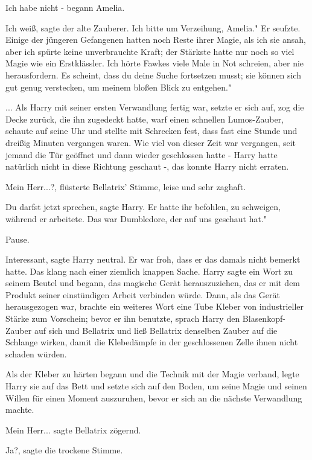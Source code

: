 \glqq Ich habe nicht -\grqq{} begann Amelia.

\glqq Ich weiß\grqq{}, sagte der alte Zauberer. \glqq Ich bitte um Verzeihung,
Amelia." Er seufzte. \glqq Einige der jüngeren Gefangenen hatten noch Reste
ihrer Magie, als ich sie ansah, aber ich spürte keine unverbrauchte Kraft; der
Stärkste hatte nur noch so viel Magie wie ein Erstklässler. Ich hörte Fawkes
viele Male in Not schreien, aber nie herausfordern. Es scheint, dass du deine
Suche fortsetzen musst; sie können sich gut genug verstecken, um meinem bloßen
Blick zu entgehen."

... Als Harry mit seiner ersten Verwandlung fertig war, setzte er sich auf, zog
die Decke zurück, die ihn zugedeckt hatte, warf einen schnellen Lumos-Zauber,
schaute auf seine Uhr und stellte mit Schrecken fest, dass fast eine Stunde und
dreißig Minuten vergangen waren. Wie viel von dieser Zeit war vergangen, seit
jemand die Tür geöffnet und dann wieder geschlossen hatte - Harry hatte
natürlich nicht in diese Richtung geschaut -, das konnte Harry nicht erraten.

\glqq Mein Herr...?\grqq{}, flüsterte Bellatrix' Stimme, leise und sehr zaghaft.

\glqq Du darfst jetzt sprechen\grqq{}, sagte Harry. Er hatte ihr befohlen, zu
schweigen, während er arbeitete. \glqq Das war Dumbledore, der auf uns geschaut
hat."

Pause.

\glqq Interessant\grqq{}, sagte Harry neutral. Er war froh, dass er das damals
nicht bemerkt hatte. Das klang nach einer ziemlich knappen Sache. Harry sagte
ein Wort zu seinem Beutel und begann, das magische Gerät herauszuziehen, das er
mit dem Produkt seiner einstündigen Arbeit verbinden würde. Dann, als das Gerät
herausgezogen war, brachte ein weiteres Wort eine Tube Kleber von industrieller
Stärke zum Vorschein; bevor er ihn benutzte, sprach Harry den Blasenkopf-Zauber
auf sich und Bellatrix und ließ Bellatrix denselben Zauber auf die Schlange
wirken, damit die Klebedämpfe in der geschlossenen Zelle ihnen nicht schaden
würden.

Als der Kleber zu härten begann und die Technik mit der Magie verband, legte
Harry sie auf das Bett und setzte sich auf den Boden, um seine Magie und seinen
Willen für einen Moment auszuruhen, bevor er sich an die nächste Verwandlung
machte.

\glqq Mein Herr...\grqq{} sagte Bellatrix zögernd.

\glqq Ja?\grqq{}, sagte die trockene Stimme.

